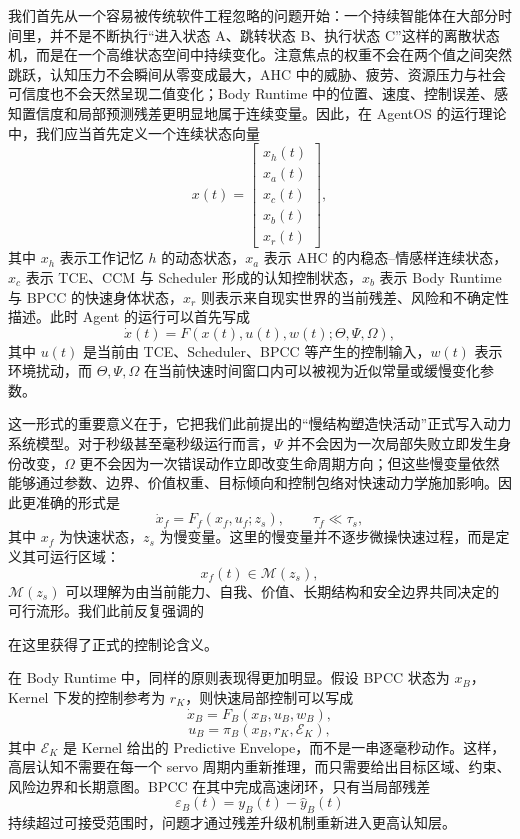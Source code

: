 我们首先从一个容易被传统软件工程忽略的问题开始：一个持续智能体在大部分时间里，并不是不断执行``进入状态 A、跳转状态 B、执行状态 C''这样的离散状态机，而是在一个高维状态空间中持续变化。注意焦点的权重不会在两个值之间突然跳跃，认知压力不会瞬间从零变成最大，AHC 中的威胁、疲劳、资源压力与社会可信度也不会天然呈现二值变化；Body Runtime 中的位置、速度、控制误差、感知置信度和局部预测残差更明显地属于连续变量。因此，在 AgentOS 的运行理论中，我们应当首先定义一个连续状态向量
\[
x(t)
=
\begin{bmatrix}
x_h(t)\\
x_a(t)\\
x_c(t)\\
x_b(t)\\
x_r(t)
\end{bmatrix},
\]
其中 $x_h$ 表示工作记忆 $h$ 的动态状态，$x_a$ 表示 AHC 的内稳态--情感样连续状态，$x_c$ 表示 TCE、CCM 与 Scheduler 形成的认知控制状态，$x_b$ 表示 Body Runtime 与 BPCC 的快速身体状态，$x_r$ 则表示来自现实世界的当前残差、风险和不确定性描述。此时 Agent 的运行可以首先写成
\[
\dot{x}(t)
=
F\left(
x(t),
u(t),
w(t);
\Theta,\Psi,\Omega
\right),
\]
其中 $u(t)$ 是当前由 TCE、Scheduler、BPCC 等产生的控制输入，$w(t)$ 表示环境扰动，而 $\Theta,\Psi,\Omega$ 在当前快速时间窗口内可以被视为近似常量或缓慢变化参数。

这一形式的重要意义在于，它把我们此前提出的``慢结构塑造快活动''正式写入动力系统模型。对于秒级甚至毫秒级运行而言，$\Psi$ 并不会因为一次局部失败立即发生身份改变，$\Omega$ 更不会因为一次错误动作立即改变生命周期方向；但这些慢变量依然能够通过参数、边界、价值权重、目标倾向和控制包络对快速动力学施加影响。因此更准确的形式是
\[
\dot{x}_f
=
F_f
\left(
x_f,
u_f;
z_s
\right),
\qquad
\tau_f\ll\tau_s,
\]
其中 $x_f$ 为快速状态，$z_s$ 为慢变量。这里的慢变量并不逐步微操快速过程，而是定义其可运行区域：
\[
x_f(t)\in\mathcal{M}(z_s),
\]
$\mathcal{M}(z_s)$ 可以理解为由当前能力、自我、价值、长期结构和安全边界共同决定的可行流形。我们此前反复强调的
\begin{statementbox}
\centering
{}
\end{statementbox}
在这里获得了正式的控制论含义。

在 Body Runtime 中，同样的原则表现得更加明显。假设 BPCC 状态为 $x_B$，Kernel 下发的控制参考为 $r_K$，则快速局部控制可以写成
\[
\dot{x}_B
=
F_B(x_B,u_B,w_B),
\]
\[
u_B
=
\pi_B
\left(
x_B,
r_K,
\mathcal{E}_K
\right),
\]
其中 $\mathcal{E}_K$ 是 Kernel 给出的 Predictive Envelope，而不是一串逐毫秒动作。这样，高层认知不需要在每一个 servo 周期内重新推理，而只需要给出目标区域、约束、风险边界和长期意图。BPCC 在其中完成高速闭环，只有当局部残差
\[
\varepsilon_B(t)
=
y_B(t)-\hat{y}_B(t)
\]
持续超过可接受范围时，问题才通过残差升级机制重新进入更高认知层。

